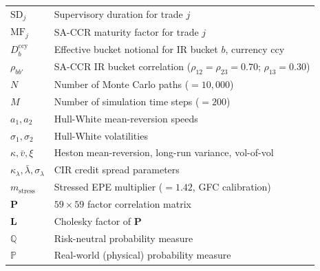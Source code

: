 \documentclass[11pt,a4paper]{article}
\begin{document}
\begin{longtable}{@{}ll@{}}
$\text{SD}_j$     & Supervisory duration for trade $j$ \\
$\text{MF}_j$     & SA-CCR maturity factor for trade $j$ \\
$D_b^{\text{ccy}}$ & Effective bucket notional for IR bucket $b$, currency ccy \\
$\rho_{bb'}$      & SA-CCR IR bucket correlation ($\rho_{12}=\rho_{23}=0.70$; $\rho_{13}=0.30$) \\
$N$               & Number of Monte Carlo paths ($= 10{,}000$) \\
$M$               & Number of simulation time steps ($= 200$) \\
$a_1, a_2$        & Hull-White mean-reversion speeds \\
$\sigma_1, \sigma_2$ & Hull-White volatilities \\
$\kappa, \bar{v}, \xi$ & Heston mean-reversion, long-run variance, vol-of-vol \\
$\kappa_\lambda, \bar{\lambda}, \sigma_\lambda$ & CIR credit spread parameters \\
$m_{\text{stress}}$ & Stressed EPE multiplier ($= 1.42$, GFC calibration) \\
$\mathbf{P}$      & $59 \times 59$ factor correlation matrix \\
$\mathbf{L}$      & Cholesky factor of $\mathbf{P}$ \\
$\mathbb{Q}$      & Risk-neutral probability measure \\
$\mathbb{P}$      & Real-world (physical) probability measure \\
\end{longtable}

\end{document}
